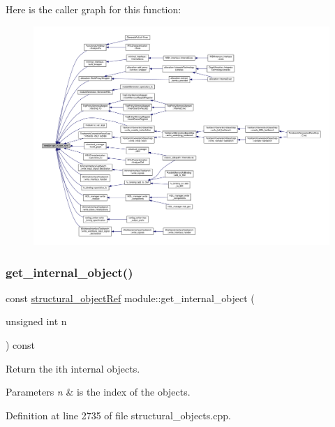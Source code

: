 Here is the caller graph for this function\+:
\nopagebreak
\begin{figure}[H]
\begin{center}
\leavevmode
\includegraphics[width=350pt]{d0/dd3/classmodule_aea3a2e04dfd2a7bd0c9e978d9d1b2454_icgraph}
\end{center}
\end{figure}
\mbox{\label{classmodule_af59435e147c07a183bf7c8ab525eb3fd}} 
\subsubsection{\texorpdfstring{get\+\_\+internal\+\_\+object()}{get\_internal\_object()}}
{\footnotesize\ttfamily const \hyperlink{structural__objects_8hpp_a8ea5f8cc50ab8f4c31e2751074ff60b2}{structural\+\_\+object\+Ref} module\+::get\+\_\+internal\+\_\+object (\begin{DoxyParamCaption}\item[{unsigned int}]{n }\end{DoxyParamCaption}) const}



Return the ith internal objects. 


\begin{DoxyParams}{Parameters}
{\em n} & is the index of the objects. \\
\hline
\end{DoxyParams}


Definition at line 2735 of file structural\+\_\+objects.\+cpp.



